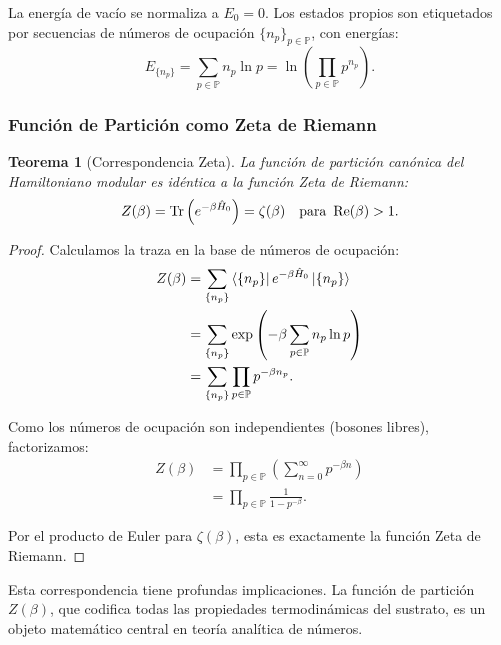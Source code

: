 \documentclass[11pt, a4paper]{article}
\theoremstyle{plain}
\newtheorem{teorema}{Teorema}[section]
\theoremstyle{definition}
\begin{document}
La energía de vacío se normaliza a $E_0 = 0$. Los estados propios son etiquetados por secuencias de números de ocupación $\{n_p\}_{p \in \mathbb{P}}$, con energías:
\begin{equation}
E_{\{n_p\}} = \sum_{p \in \mathbb{P}} n_p \ln p = \ln\left(\prod_{p \in \mathbb{P}} p^{n_p}\right).
\end{equation}

\subsubsection{Función de Partición como Zeta de Riemann}

\begin{teorema}[Correspondencia Zeta]
La función de partición canónica del Hamiltoniano modular es idéntica a la función Zeta de Riemann:
\begin{equation}
Z(\beta) = \Tr\left(e^{-\beta \hat{H}_0}\right) = \zeta(\beta) \quad \text{para } \Re(\beta) > 1.
\label{eq:zeta_correspondence}
\end{equation}
\end{teorema}

\begin{proof}
Calculamos la traza en la base de números de ocupación:
\begin{align*}
Z(\beta) &= \sum_{\{n_p\}} \bra{\{n_p\}} e^{-\beta \hat{H}_0} \ket{\{n_p\}} \\
&= \sum_{\{n_p\}} \exp\left(-\beta \sum_{p \in \mathbb{P}} n_p \ln p\right) \\
&= \sum_{\{n_p\}} \prod_{p \in \mathbb{P}} p^{-\beta n_p}.
\end{align*}

Como los números de ocupación son independientes (bosones libres), factorizamos:
\begin{align*}
Z(\beta) &= \prod_{p \in \mathbb{P}} \left( \sum_{n=0}^\infty p^{-\beta n} \right) \\
&= \prod_{p \in \mathbb{P}} \frac{1}{1 - p^{-\beta}}.
\end{align*}

Por el producto de Euler para $\zeta(\beta)$, esta es exactamente la función Zeta de Riemann.
\end{proof}

Esta correspondencia tiene profundas implicaciones. La función de partición $Z(\beta)$, que codifica todas las propiedades termodinámicas del sustrato, es un objeto matemático central en teoría analítica de números.
\end{document}
